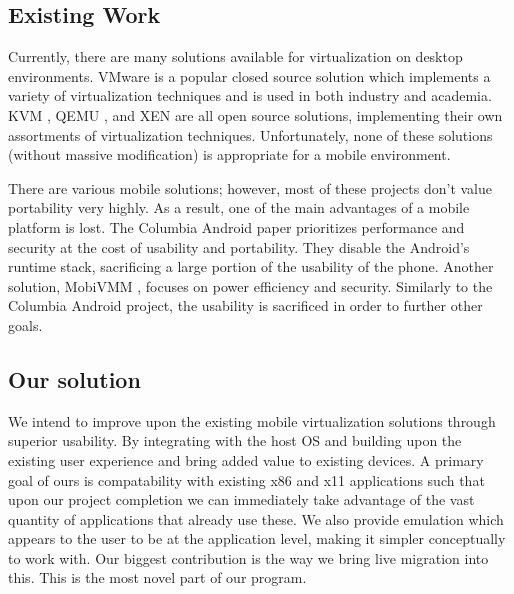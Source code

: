 \subsection{Existing Work}
Currently, there are many solutions available for virtualization on desktop environments.  VMware is a popular closed source solution which implements a variety of virtualization techniques and is used in both industry and academia.  KVM \cite{kvm}, QEMU \cite{qemu}, and XEN \cite{xen} are all open source solutions, implementing their own assortments of virtualization techniques.  Unfortunately, none of these solutions (without massive modification) is appropriate for a mobile environment.

There are various mobile solutions; however, most of these projects don't value portability very highly.  As a result, one of the main advantages of a mobile platform is lost.  The Columbia Android paper prioritizes performance and security at the cost of usability and portability. They disable the Android's runtime stack, sacrificing a large portion of the usability of the phone.  Another solution, MobiVMM \cite{mobivmm}, focuses on power efficiency and security.  Similarly to the Columbia Android project, the usability is sacrificed in order to further other goals.

\subsection{Our solution}
We intend to improve upon the existing mobile virtualization solutions through superior usability.  By integrating with the host OS and building upon the existing user experience and bring added value to existing devices.
A primary goal of ours is compatability with existing x86 and x11 applications such that upon our project completion we can immediately take advantage of the vast quantity of applications that already use these.
We also provide emulation which appears to the user to be at the application level, making it simpler conceptually to work with.
Our biggest contribution is the way we bring live migration into this.  This is the most novel part of our program.
